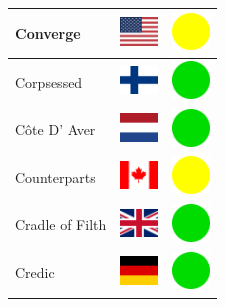\documentclass[12pt, a4paper, twoside]{report}
\begin{document}
\begin{center}
\begin{longtable}{|p{5cm}|p{2cm}|p{2cm}|}
Converge & \includegraphics[width=1cm]{4x3/us} & \includegraphics[width=1cm]{likes/m} \\ \hline
Corpsessed & \includegraphics[width=1cm]{4x3/fi} & \includegraphics[width=1cm]{likes/y} \\ \hline
Côte D' Aver & \includegraphics[width=1cm]{4x3/nl} & \includegraphics[width=1cm]{likes/y} \\ \hline
Counterparts & \includegraphics[width=1cm]{4x3/ca} & \includegraphics[width=1cm]{likes/m} \\ \hline
Cradle of Filth & \includegraphics[width=1cm]{4x3/gb} & \includegraphics[width=1cm]{likes/y} \\ \hline
Credic & \includegraphics[width=1cm]{4x3/de} & \includegraphics[width=1cm]{likes/y} \\ \hline

\end{longtable}
\end{center}
\end{document}
